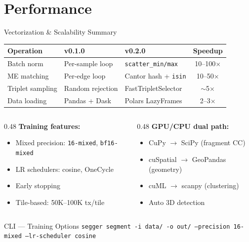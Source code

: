 \documentclass[aspectratio=169,10pt]{beamer}
\begin{document}
\section{Performance}

\begin{frame}{Vectorization \& Scalability Summary}

\begin{center}
{\small
\renewcommand{\arraystretch}{1.15}
\begin{tabular}{@{}l l l c@{}}
\toprule
\textbf{Operation} & \textbf{v0.1.0} & \textbf{v0.2.0} & \textbf{Speedup} \\
\midrule
Batch norm & Per-sample loop & \texttt{scatter\_min/max} & \alert{10--100$\times$} \\
ME matching & Per-edge loop & Cantor hash + \texttt{isin} & \alert{10--50$\times$} \\
Triplet sampling & Random rejection & FastTripletSelector & \alert{$\sim$5$\times$} \\
Data loading & Pandas + Dask & Polars LazyFrames & \alert{2--3$\times$} \\
\bottomrule
\end{tabular}
}
\end{center}

\vspace{0.2cm}

\begin{columns}[T]
\begin{column}{0.48\textwidth}
\textbf{Training features:}
{\small
\begin{itemize}\setlength\itemsep{1pt}
  \item Mixed precision: \texttt{16-mixed}, \texttt{bf16-mixed}
  \item LR schedulers: cosine, OneCycle
  \item Early stopping
  \item Tile-based: 50K--100K tx/tile
\end{itemize}
}
\end{column}
\begin{column}{0.48\textwidth}
\textbf{GPU/CPU dual path:}
{\small
\begin{itemize}\setlength\itemsep{1pt}
  \item CuPy $\to$ SciPy (fragment CC)
  \item cuSpatial $\to$ GeoPandas (geometry)
  \item cuML $\to$ scanpy (clustering)
  \item Auto 3D detection
\end{itemize}
}
\end{column}
\end{columns}

\vspace{0.15cm}
\begin{exampleblock}{CLI --- Training Options}
\centering
{\small\texttt{segger segment -i data/ -o out/ --precision 16-mixed --lr-scheduler cosine}}
\end{exampleblock}
\end{frame}
\end{document}
